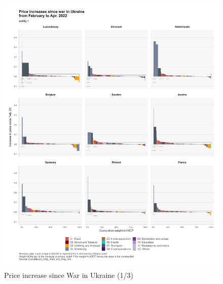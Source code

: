 \documentclass[
  9pt,
  a4paper,
  DIV=11,
  numbers=noendperiod]{scrartcl}
\begin{document}
\begin{figure}

\caption{Price increase since War in Ukraine (1/3)}

{\centering \includegraphics[width=16cm,height=\textheight]{../svg/depuis_wiu_1.png}

}

\end{figure}
\end{document}
